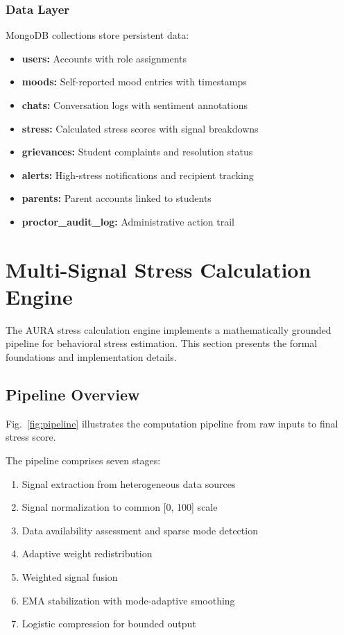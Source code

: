 \documentclass[journal]{IEEEtran}
\begin{document}
\subsubsection{Data Layer}
MongoDB collections store persistent data:
\begin{itemize}
    \item \textbf{users:} Accounts with role assignments
    \item \textbf{moods:} Self-reported mood entries with timestamps
    \item \textbf{chats:} Conversation logs with sentiment annotations
    \item \textbf{stress:} Calculated stress scores with signal breakdowns
    \item \textbf{grievances:} Student complaints and resolution status
    \item \textbf{alerts:} High-stress notifications and recipient tracking
    \item \textbf{parents:} Parent accounts linked to students
    \item \textbf{proctor\_audit\_log:} Administrative action trail
\end{itemize}

\section{Multi-Signal Stress Calculation Engine}
\label{sec:engine}

The AURA stress calculation engine implements a mathematically grounded pipeline for behavioral stress estimation. This section presents the formal foundations and implementation details.

\subsection{Pipeline Overview}

Fig.~\ref{fig:pipeline} illustrates the computation pipeline from raw inputs to final stress score.

The pipeline comprises seven stages:
\begin{enumerate}
    \item Signal extraction from heterogeneous data sources
    \item Signal normalization to common [0, 100] scale
    \item Data availability assessment and sparse mode detection
    \item Adaptive weight redistribution
    \item Weighted signal fusion
    \item EMA stabilization with mode-adaptive smoothing
    \item Logistic compression for bounded output
\end{enumerate}
\end{document}
